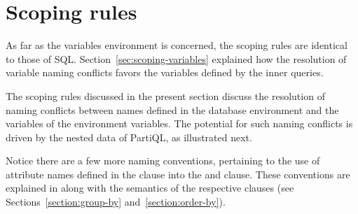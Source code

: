 \section{Scoping rules}
\label{sec:variable-scoping}

As far as the variables environment is concerned, the scoping rules are
identical to those of SQL. Section~\ref{sec:scoping-variables} explained how the
resolution of variable naming conflicts favors the variables defined by the
inner queries.

The scoping rules discussed in the present section discuss the resolution of
naming conflicts between names defined in the database environment and the
variables of the environment variables. The potential for such naming conflicts
is driven by the nested data of PartiQL, as illustrated next.

Notice there are a few more naming conventions, pertaining to the use of
attribute names defined in the  clause into the  and
 clause. These conventions are explained in along with the
semantics of the respective clauses (see Sections~\ref{section:group-by}
and~\ref{section:order-by}).


